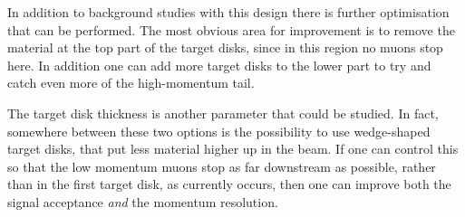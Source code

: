 In addition to background studies with this design there is further optimisation that can be performed.
The most obvious area for improvement is to remove the material at the top part of the target disks, since in this region no muons stop here.
In addition one can add more target disks to the lower part to try and catch even more of the high-momentum tail.

The target disk thickness is another parameter that could be studied.
In fact, somewhere between these two options is the possibility to use wedge-shaped target disks, that put less material higher up in the beam.
If one can control this so that the low momentum muons stop as far downstream as possible, rather than in the first target disk, as currently occurs, then one can improve both the signal acceptance \emph{and} the momentum resolution.
